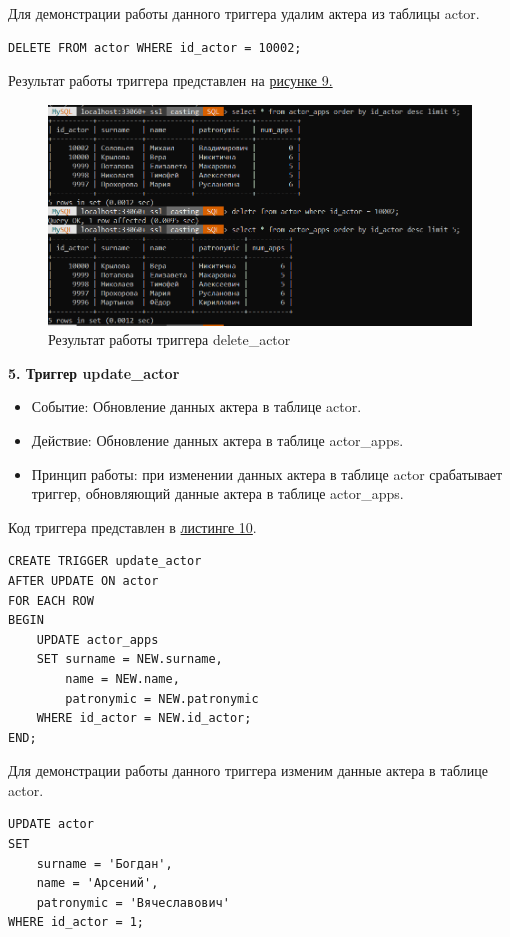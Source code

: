 \documentclass[11pt,a4paper,final]{article} %
\begin{document}
Для демонстрации работы данного триггера удалим актера из таблицы actor.

\begin{lstlisting}
DELETE FROM actor WHERE id_actor = 10002;
\end{lstlisting}


Результат работы триггера представлен на \hyperref[fig:pic9]{рисунке 9.}

\begin{figure}[H]
	\centering
	\includegraphics[width=0.9\linewidth]{pic9.png}
	\caption{Результат работы триггера delete\_actor}
	\label{fig:pic9}
\end{figure}




\textbf{5. Триггер update\_actor}
\begin{itemize}
	\item Событие: Обновление данных актера в таблице actor.
	\item Действие: Обновление данных актера в таблице actor\_apps.
	\item Принцип работы: при изменении данных актера в таблице actor срабатывает триггер, обновляющий данные актера в таблице actor\_apps.
\end{itemize}

Код триггера представлен в \hyperref[lst:l10]{листинге 10}.
\newpage
\begin{lstlisting}[caption={Код триггера update\_actor}, label=lst:l10]
CREATE TRIGGER update_actor
AFTER UPDATE ON actor
FOR EACH ROW
BEGIN
	UPDATE actor_apps
	SET surname = NEW.surname,
		name = NEW.name,
		patronymic = NEW.patronymic
	WHERE id_actor = NEW.id_actor;
END;	
\end{lstlisting}


Для демонстрации работы данного триггера изменим данные актера в таблице actor.

\begin{lstlisting}
UPDATE actor
SET 
	surname = 'Богдан',
	name = 'Арсений',
	patronymic = 'Вячеславович'
WHERE id_actor = 1;	
\end{lstlisting}
\end{document}
